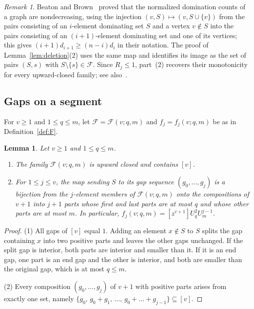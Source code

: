 \documentclass{amsart}
\newtheorem{lemma}[theorem]{Lemma}
\theoremstyle{definition}
\theoremstyle{remark}
\newtheorem{remark}[theorem]{Remark}
\numberwithin{equation}{section}
\newcommand{\cF}{\mathcal{F}}
\newcommand{\coef}[1]{[z^{#1}]}
\begin{document}
\begin{remark}\label{rem:BB}
Beaton and Brown~\cite[Section~3]{BB} proved that the normalized domination counts of a graph are nondecreasing, using the injection $(v,S)\mapsto(v,S\cup\{v\})$ from the pairs consisting of an $i$-element dominating set $S$ and a vertex $v\notin S$ into the pairs consisting of an $(i+1)$-element dominating set and one of its vertices; this gives $(i+1)d_{i+1}\ge(n-i)d_i$ in their notation. The proof of Lemma~\ref{lem:deletion}(2) uses the same map and identifies its image as the set of pairs $(S,s)$ with $S\setminus\{s\}\in\cF$. Since $R_j\le1$, part~(2) recovers their monotonicity for every upward-closed family; see also~\cite[Proposition~2]{O}.
\end{remark}

\subsection{Gaps on a segment}
For $v\ge1$ and $1\le q\le m$, let $\cF=\cF(v;q,m)$ and $f_j=f_j(v;q,m)$ be as in Definition~\ref{def:F}.

\begin{lemma}\label{lem:segment}
Let $v\ge1$ and $1\le q\le m$.
\begin{enumerate}
\item The family $\cF(v;q,m)$ is upward closed and contains $[v]$.
\item For $1\le j\le v$, the map sending $S$ to its gap sequence $(g_0,\dots,g_j)$ is a bijection from the $j$-element members of $\cF(v;q,m)$ onto the compositions of $v+1$ into $j+1$ parts whose first and last parts are at most $q$ and whose other parts are at most $m$. In particular, $f_j(v;q,m)=\coef{v+1}U_q^2U_m^{j-1}$.
\end{enumerate}
\end{lemma}

\begin{proof}
(1) All gaps of $[v]$ equal $1$. Adding an element $x\notin S$ to $S$ splits the gap containing $x$ into two positive parts and leaves the other gaps unchanged. If the split gap is interior, both parts are interior and smaller than it. If it is an end gap, one part is an end gap and the other is interior, and both are smaller than the original gap, which is at most $q\le m$.

(2) Every composition $(g_0,\dots,g_j)$ of $v+1$ with positive parts arises from exactly one set, namely $\{g_0,\,g_0+g_1,\,\dots,\,g_0+\dots+g_{j-1}\}\subseteq[v]$.
\end{proof}
\end{document}
